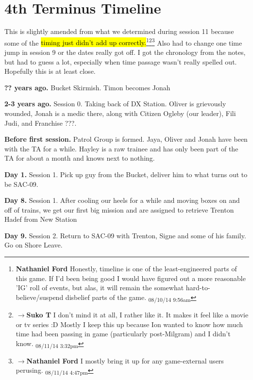 \setcounter{chapter}{ -1 }
\chapter{\textbf{4th Terminus Timeline} }




This is slightly amended from what we determined during session 11 because some of the \hl{timing just didn't add up correctly.}\footnote{\textbf{Nathaniel Ford }Honestly, timeline is one of the least-engineered parts of this game. If I'd been being good I would have figured out a more reasonable 'IG' roll of events, but alas, it will remain the somewhat hard-to-believe/suspend disbelief parts of the game. \textsubscript{08/10/14 9:56am}}\footnote{$\rightarrow$\textbf{Suko T }I don't mind it at all, I rather like it.  It makes it feel like a movie or tv series :D  Mostly I keep this up because Ion wanted to know how much time had been passing in game (particularly post-Milgram) and I didn't know. \textsubscript{08/11/14 3:32pm}}\footnote{$\rightarrow$\textbf{Nathaniel Ford }I mostly bring it up for any game-external users perusing. \textsubscript{08/11/14 4:47pm}}  Also had to change one time jump in session 9 or the dates really got off.  I got the chronology from the notes, but had to guess a lot, especially when time passage wasn't really spelled out.  Hopefully this is at least close. 



\textbf{?? years ago.} Bucket Skirmish.  Timon becomes Jonah



\textbf{2-3 years ago.}  Session 0. Taking back of DX Station.  Oliver is grievously wounded, Jonah is a medic there, along with Citizen Ogleby (our leader), Fili Judi, and Franchise ???.  



\textbf{Before first session.} Patrol Group is formed.  Jaya, Oliver and Jonah have been with the TA for a while.  Hayley is a raw trainee and has only been part of the TA for about a month and knows next to nothing.



\textbf{Day 1.} Session 1.  Pick up guy from the Bucket, deliver him to what turns out to be SAC-09.

\textbf{Day 8.} Session 1.  After cooling our heels for a while and moving boxes on and off of trains, we get our first big mission and are assigned to retrieve Trenton Hadef from New Station

\textbf{Day 9.} Session 2. Return to SAC-09 with Trenton, Signe and some of his family.  Go on Shore Leave.


